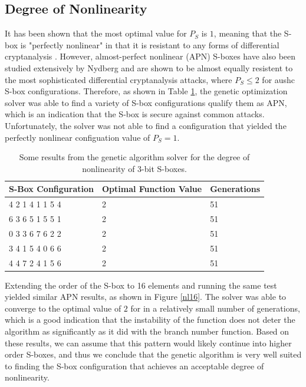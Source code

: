 \documentclass[11pt]{article}
\begin{document}
\subsection{Degree of Nonlinearity}
It has been shown that the most optimal value for $P_S$ is $1$, meaning that the S-box is "perfectly nonlinear" in that it is resistant to any forms of differential cryptanalysis \cite{ProvableSecurity}. However, almost-perfect nonlinear (APN) S-boxes have also been studied extensively by Nydberg and are shown to be almost equally resistent to the most sophisticated differential cryptanalysis attacks, where $P_S \leq 2$ for aushc S-box configurations. Therefore, as shown in Table \ref{nlTable}, the genetic optimization solver was able to find a variety of S-box configurations qualify them as APN, which is an indication that the S-box is secure against common attacks. Unfortunately, the solver was not able to find a configuration that yielded the perfectly nonlinear configuation value of $P_S = 1$. 

\begin{table}
	\centering
	\caption{Some results from the genetic algorithm solver for the degree of nonlinearity of $3$-bit S-boxes.}
	\label{nlTable}
    \begin{tabular}{|l|l|l|}
        \hline
        S-Box Configuration & Optimal Function Value & Generations \\ \hline
        4     2     1     4     1     1     5     4 & 2 & 51 \\ 
        6     3     6     5     1     5     5     1 & 2 & 51 \\ 
        0     3     3     6     7     6     2     2 & 2 & 51 \\ 
        3     4     1     5     4     0     6     6 & 2 & 51 \\ 
        4     4     7     2     4     1     5     6 & 2 & 51 \\ 
        \hline
    \end{tabular}
\end{table}

Extending the order of the S-box to 16 elements and running the same test yielded similar APN results, as shown in Figure \ref{nl16}. The solver was able to converge to the optimal value of $2$ for in a relatively small number of generations, which is a good indication that the instability of the function does not deter the algorithm as significantly as it did with the branch number function. Based on these results, we can assume that this pattern would likely continue into higher order S-boxes, and thus we conclude that the genetic algorithm is very well suited to finding the S-box configuration that achieves an acceptable degree of nonlinearity.
\end{document}
